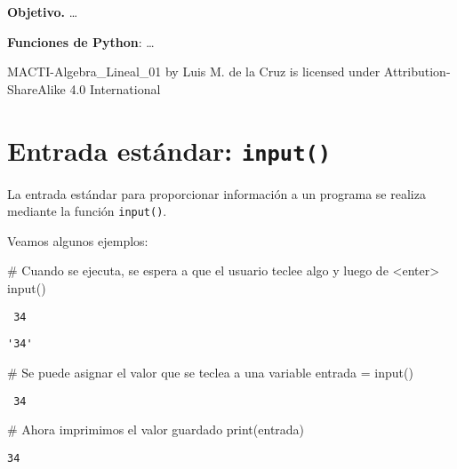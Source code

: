 \documentclass[
  letterpaper,
  DIV=11,
  numbers=noendperiod]{scrreprt}
\newenvironment{Shaded}{\begin{snugshade}}{\end{snugshade}}
\newcommand{\BuiltInTok}[1]{\textcolor[rgb]{0.00,0.23,0.31}{#1}}
\newcommand{\CommentTok}[1]{\textcolor[rgb]{0.37,0.37,0.37}{#1}}
\newcommand{\NormalTok}[1]{\textcolor[rgb]{0.00,0.23,0.31}{#1}}
\newcommand{\OperatorTok}[1]{\textcolor[rgb]{0.37,0.37,0.37}{#1}}
\begin{document}
\textbf{Objetivo.} \ldots{}

\textbf{Funciones de Python}: \ldots{}

MACTI-Algebra\_Lineal\_01 by Luis M. de la Cruz is licensed under
Attribution-ShareAlike 4.0 International


\chapter{\texorpdfstring{Entrada estándar:
\texttt{input()}}{Entrada estándar: input()}}\label{entrada-estuxe1ndar-input}

La entrada estándar para proporcionar información a un programa se
realiza mediante la función \texttt{input()}.

Veamos algunos ejemplos:

\begin{Shaded}
\begin{Highlighting}[]
\CommentTok{\# Cuando se ejecuta, se espera a que el usuario teclee algo y luego de \textless{}enter\textgreater{}}
\BuiltInTok{input}\NormalTok{() }
\end{Highlighting}
\end{Shaded}

\begin{verbatim}
 34
\end{verbatim}

\begin{verbatim}
'34'
\end{verbatim}

\begin{Shaded}
\begin{Highlighting}[]
\CommentTok{\# Se puede asignar el valor que se teclea a una variable}
\NormalTok{entrada }\OperatorTok{=} \BuiltInTok{input}\NormalTok{()}
\end{Highlighting}
\end{Shaded}

\begin{verbatim}
 34
\end{verbatim}

\begin{Shaded}
\begin{Highlighting}[]
\CommentTok{\# Ahora imprimimos el valor guardado}
\BuiltInTok{print}\NormalTok{(entrada) }
\end{Highlighting}
\end{Shaded}

\begin{verbatim}
34
\end{verbatim}
\end{document}
